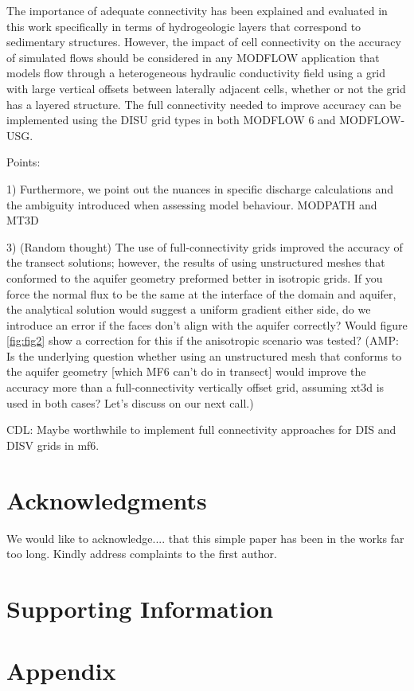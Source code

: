\documentclass{article}
\begin{document}
The importance of adequate connectivity has been explained and evaluated in this work specifically in terms of hydrogeologic layers that correspond to sedimentary structures. However, the impact of cell connectivity on the accuracy of simulated flows should be considered in any MODFLOW application that models flow through a heterogeneous hydraulic conductivity field using a grid with large vertical offsets between laterally adjacent cells, whether or not the grid has a layered structure. The full connectivity needed to improve accuracy can be implemented using the DISU grid types in both MODFLOW 6 and MODFLOW-USG.

Points:

1) Furthermore, we point out the nuances in specific discharge calculations and the ambiguity introduced when assessing model behaviour.  MODPATH and MT3D

3) (Random thought) The use of full-connectivity grids improved the accuracy of the transect solutions; however, the results of \citep{bardot2022} using unstructured meshes that conformed to the aquifer geometry preformed better in isotropic grids. If you force the normal flux to be the same at the interface of the domain and aquifer, the analytical solution would suggest a uniform gradient either side, do we introduce an error if the faces don't align with the aquifer correctly?  Would figure \ref{fig:fig2} show a correction for this if the anisotropic scenario was tested?  {\color{red} (AMP: Is the underlying question whether using an unstructured mesh that conforms to the aquifer geometry [which MF6 can't do in transect] would improve the accuracy more than a full-connectivity vertically offset grid, assuming xt3d is used in both cases? Let's discuss on our next call.)}

 {\color{red} CDL: Maybe worthwhile to implement full connectivity approaches for DIS and DISV grids in mf6.}

\section{Acknowledgments}
We would like to acknowledge.... {\color{red} that this simple paper has been in the works far too long. Kindly address complaints to the first author.}

\section{Supporting Information}

\section{Appendix}


\end{document}
